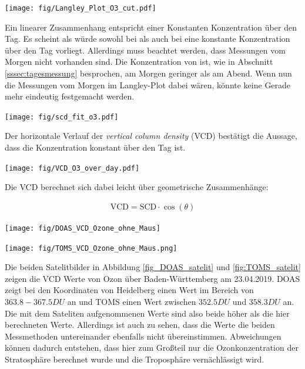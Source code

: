 \documentclass[12pt, a4paper, bibliography=totoc]{scrartcl}
\begin{document}
\begin{multicols}{2}
\begin{center}
	\texttt{[image: fig/Langley\_Plot\_O3\_cut.pdf]}
	\label{fig:langley_O3}
\end{center}

Ein linearer Zusammenhang entspricht einer Konstanten Konzentration über den Tag. 
Es scheint als würde sowohl bei  als auch bei  eine konstante Konzentration über den Tag vorliegt.
Allerdings muss beachtet werden, dass Messungen vom Morgen nicht vorhanden sind.
Die Konzentration von  ist, wie in Abschnitt \ref{sssec:tagesmessung} besprochen, am Morgen geringer als am Abend.
Wenn nun die Messungen vom Morgen im Langley-Plot dabei wären, könnte keine Gerade mehr eindeutig festgemacht werden.

\begin{center}
	\texttt{[image: fig/scd\_fit\_o3.pdf]}
	\label{fig:scd_fit_o3}
\end{center}

Der horizontale Verlauf der \textit{vertical column density} (VCD) bestätigt die Aussage, dass die  Konzentration konstant über den Tag ist.

\begin{center}
	\texttt{[image: fig/VCD\_O3\_over\_day.pdf]}
	\label{fig:VCD_O3_over_day}
\end{center} 

Die VCD berechnet sich dabei leicht über geometrische Zusammenhänge: 

\begin{align}
    \text{VCD} = \text{SCD} \cdot \cos(\theta)
\end{align}

\begin{center}
	\texttt{[image: fig/DOAS\_VCD\_Ozone\_ohne\_Maus]}
	\label{fig:DOAS_satelit}
\end{center} 

\begin{center}
	\texttt{[image: fig/TOMS\_VCD\_Ozone\_ohne\_Maus.png]}
	\label{fig:TOMS_satelit}
\end{center} 
Die beiden Satelitbilder in Abbildung \ref{fig_DOAS_satelit} und \ref{fig:TOMS_satelit} zeigen die VCD Werte von Ozon über Baden-Württemberg am 23.04.2019.
DOAS zeigt bei den Koordinaten von Heidelberg einen Wert im Bereich von $363.8 - 367.5 \si{DU}$ an und TOMS einen Wert zwischen $352.5 \si{DU}$ und $358.3 \si{DU}$ an.
Die mit dem Sateliten aufgenommenen Werte sind also beide höher als die hier berechneten Werte.
Allerdings ist auch zu sehen, dass die Werte die beiden Messmethoden untereinander ebenfalls nicht übereinstimmen.
Abweichungen können dadurch entstehen, dass hier zum Großteil nur die Ozonkonzentration der Stratosphäre berechnet wurde und die Troposphäre vernächlässigt wird.



\end{multicols}
\end{document}
